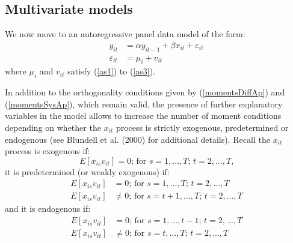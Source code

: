 \documentclass[12pt,a4paper,english]{article}%
\begin{document}

\subsection*{Multivariate models}

We now move to an autoregressive panel data model of the form:
\begin{equation}
\label{modelarmul}
\tag{8'}
\begin{aligned}
y_{it}&=\alpha y_{it-1} + \beta x_{it} + \varepsilon_{it}\\
\varepsilon_{it}&=\mu _{i}+v_{it}
\end{aligned}
\end{equation}
where $\mu _{i}$ and $v_{it}$ satisfy (\ref{as1}) to (\ref{as3}).

In addition to the orthogonality conditions given by (\ref{momentsDiffAp}) and (\ref{momentsSysAp}), which remain valid, the presence of further explanatory variables in the model allows to increase the number of moment conditions depending on whether the $x_{it}$ process is strictly exogenous, predetermined or endogenous (see Blundell et al. (2000) for additional details). Recall the $x_{it}$ process is exogenous if:
\begin{equation}
\label{ruleexo}
\tag{9'}
E\left[x_{is}v_{it}\right]=0\text{; for $s=1,...,T$; $t=2,...,T$,}
\end{equation}
it is predetermined (or weakly exogenous) if:
\begin{equation}
\label{rulepre}
\tag{10'}
\begin{aligned}
E\left[x_{is}v_{it}\right]&=0\text{; for $s=1,...,T$; $t=2,...,T$}\\
E\left[x_{is}v_{it}\right]&\neq 0\text{; for $s=t+1,...,T$; $t=2,...,T$}
\end{aligned}
\end{equation}
and it is endogenous if:
\begin{equation}
\label{ruleend}
\tag{11'}
\begin{aligned}
E\left[x_{is}v_{it}\right]&=0\text{; for $s=1,...,t-1$; $t=2,...,T$}\\
E\left[x_{is}v_{it}\right]&\neq 0\text{; for $s=t,...,T$; $t=2,...,T$}
\end{aligned}
\end{equation}
\end{document}
